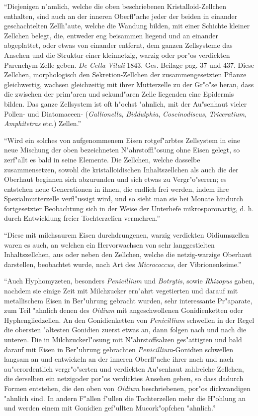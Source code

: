 \documentclass[a4paper, 11pt, oneside]{article}
\begin{document}
"`Diejenigen n"amlich, welche die oben beschriebenen Kristalloid-Zellchen enthalten, sind auch an der inneren Oberfl"ache jeder der beiden in einander geschachtelten Zellh"aute, welche die Wandung bilden, mit einer Schichte kleiner Zellchen belegt, die, entweder eng beisammen liegend und an einander abgeplattet, oder etwas von einander entfernt, dem ganzen Zellsysteme das Ansehen und die Struktur einer kleinnetzig, warzig oder por"os verdickten Parenchym-Zelle geben. \emph{De Cella Vitali} 1843. Ges. Beilage pag. 37 und 437. Diese Zellchen, morphologisch den Sekretion-Zellchen der zusammengesetzten Pflanze gleichwertig, wachsen gleichzeitig mit ihrer Mutterzelle zu der Gr"o"se heran, dass die zwischen der prim"aren und sekund"aren Zelle liegenden eine Epidermis bilden. Das ganze Zellsystem ist oft h"ochst "ahnlich, mit der Au"senhaut vieler Pollen- und Diatomaceen- (\emph{Gallionella}, \emph{Biddulphia}, \emph{Coscinodiscus}, \emph{Triceratium}, \emph{Amphitetras} etc.) Zellen."'

"`Wird ein solches von aufgenommenem Eisen rotgef"arbtes Zellsystem in eine neue Mischung der oben bezeichneten N"ahrstoffl"osung ohne Eisen gelegt, so zerf"allt es bald in seine Elemente. Die Zellchen, welche dasselbe zusammensetzen, sowohl die kristalloidischen Inhaltszellchen als auch die der Oberhaut beginnen sich abzurunden und sich etwas zu Vergr"o"serern; es entstehen neue Generationen in ihnen, die endlich frei werden, indem ihre Spezialmutterzelle verfl"ussigt wird, und so sieht man sie bei Monate hindurch fortgesetzter Beobachtung sich in der Weise der Unterhefe mikrosporonartig, d. h. durch Entwicklung freier Tochterzelien vermehren."'

"`Diese mit milchsaurem Eisen durchdrungenen, warzig verdickten Oidiumszellen waren es auch, an welchen ein Hervorwachsen von sehr langgestielten Inhaltszellchen, aus oder neben den Zellchen, welche die netzig-warzige Oberhaut darstellen, beobachtet wurde, nach Art des \emph{Micrococcus}, der Vibrionenkeime."'

"`Auch Hyphomyzeten, besonders \emph{Penicillium} und \emph{Botrytis}, sowie \emph{Rhizopus} gaben, nachdem sie einige Zeit mit Milchzucker ern"ahrt vegetierten und darauf mit metallischem Eisen in Ber"uhrung gebracht wurden, sehr interessante Pr"aparate, zum Teil "ahnlich denen des \emph{Oidium} mit angeschwollenen Gonidienketten oder Hyphengliedzellen. An den Gonidienketten von \emph{Penicillium} schwellen in der Regel die obersten "altesten Gonidien zuerst etwas an, dann folgen nach und nach die unteren. Die in Milchzuckerl"osung mit N"ahrstoffsalzen ges"attigten und bald darauf mit Eisen in Ber"uhrung gebrachten \emph{Penicillium}-Gonidien schwellen langsam an und entwickeln an der inneren Oberfl"ache ihrer nach und nach au"serordentlich vergr"o"serten und verdickten Au"senhaut zahlreiche Zellchen, die derselben ein netzigoder por"os verdicktes Ansehen geben, so dass dadurch Formen entstehen, die den oben von \emph{Oidium} beschriebenen, por"os dickwandigen "ahnlich sind. In andern F"allen f"ullen die Tochterzellen mehr die H"ohlung an und werden einem mit Gonidien gef"ullten Mucork"opfchen "ahnlich."'
\end{document}
